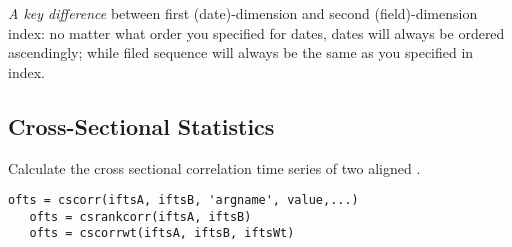  \emph{A key difference} between first (date)-dimension and second (field)-dimension index: 
  no matter what order you specified for dates, dates will always be ordered ascendingly; 
  while filed sequence will always be the same as you specified in index.

\subsection{Cross-Sectional Statistics}

    Calculate the cross sectional correlation time series of two aligned \myfints{}.

\usage
   \begin{lstlisting}[numbers=none]
   ofts = cscorr(iftsA, iftsB, 'argname', value,...)
   ofts = csrankcorr(iftsA, iftsB)
   ofts = cscorrwt(iftsA, iftsB, iftsWt)   
   \end{lstlisting}

